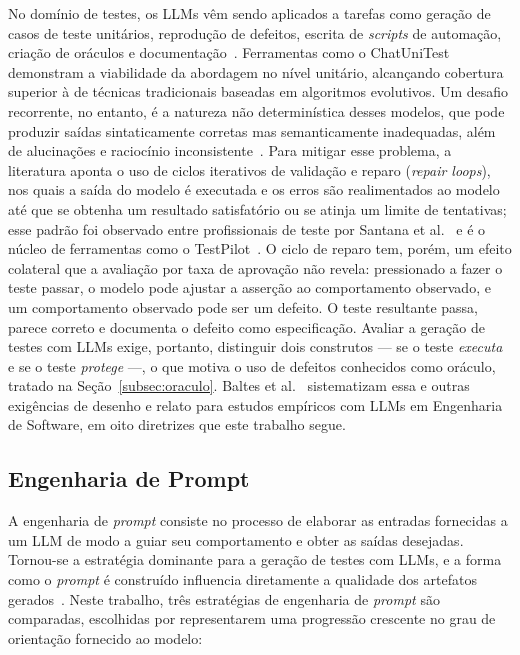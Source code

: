\documentclass[12pt]{article}
\begin{document}
No domínio de testes, os LLMs vêm sendo aplicados a tarefas como geração de
casos de teste unitários, reprodução de defeitos, escrita de \textit{scripts}
de automação, criação de oráculos e documentação~\cite{wang2024survey,
santana2025software}. Ferramentas como o ChatUniTest~\cite{chen2024chatunitest}
demonstram a viabilidade da abordagem no nível unitário, alcançando cobertura
superior à de técnicas tradicionais baseadas em algoritmos evolutivos. Um
desafio recorrente, no entanto, é a natureza não determinística desses
modelos, que pode produzir saídas sintaticamente corretas mas semanticamente
inadequadas, além de alucinações e raciocínio inconsistente~\cite{santana2025software}.
Para mitigar esse problema, a literatura aponta o uso de ciclos iterativos
de validação e reparo (\textit{repair loops}), nos quais a saída do modelo é
executada e os erros são realimentados ao modelo até que se obtenha um
resultado satisfatório ou se atinja um limite de tentativas; esse padrão foi
observado entre profissionais de teste por Santana et
al.~\cite{santana2025software} e é o núcleo de ferramentas como o
TestPilot~\cite{schafer2024testpilot}. O ciclo de reparo tem, porém, um
efeito colateral que a avaliação por taxa de aprovação não revela: pressionado
a fazer o teste passar, o modelo pode ajustar a asserção ao comportamento
observado, e um comportamento observado pode ser um defeito. O teste
resultante passa, parece correto e documenta o defeito como especificação.
Avaliar a geração de testes com LLMs exige, portanto, distinguir dois
construtos --- se o teste \emph{executa} e se o teste \emph{protege} ---, o
que motiva o uso de defeitos conhecidos como oráculo, tratado na
Seção~\ref{subsec:oraculo}. Baltes et al.~\cite{baltes2026guidelines}
sistematizam essa e outras exigências de desenho e relato para estudos
empíricos com LLMs em Engenharia de Software, em oito diretrizes que este
trabalho segue.

\subsection{Engenharia de Prompt}
\label{subsec:prompt}

A engenharia de \textit{prompt} consiste no processo de elaborar as entradas
fornecidas a um LLM de modo a guiar seu comportamento e obter as saídas
desejadas. Tornou-se a estratégia dominante para a geração de testes com
LLMs, e a forma como o \textit{prompt} é construído influencia diretamente a
qualidade dos artefatos gerados~\cite{wang2024survey}. Neste trabalho, três
estratégias de engenharia de \textit{prompt} são comparadas, escolhidas por
representarem uma progressão crescente no grau de orientação fornecido ao
modelo:
\end{document}
